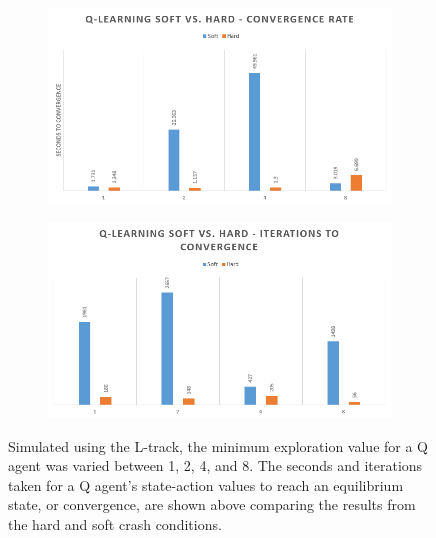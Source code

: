 \documentclass[12pt, letter]{article}
\begin{document}
\begin{figure}[h] 
    \centering
    \begin{subfigure}[b]{0.49\textwidth}
        \includegraphics[width=1\textwidth]{img/softVhard/Q/Time}
    \end{subfigure}
    \begin{subfigure}[b]{0.49\textwidth}
        \includegraphics[width=1\textwidth]{img/softVhard/Q/Iter}
    \end{subfigure}
    \caption{Simulated using the L-track, the minimum exploration value for a Q agent was varied between 1, 2, 4, and 8. The seconds and iterations taken for a Q agent's state-action values to reach an equilibrium state, or convergence, are shown above comparing the results from the hard and soft crash conditions.}
    \label{fig:svhQTimeIter}
\end{figure}
\end{document}
